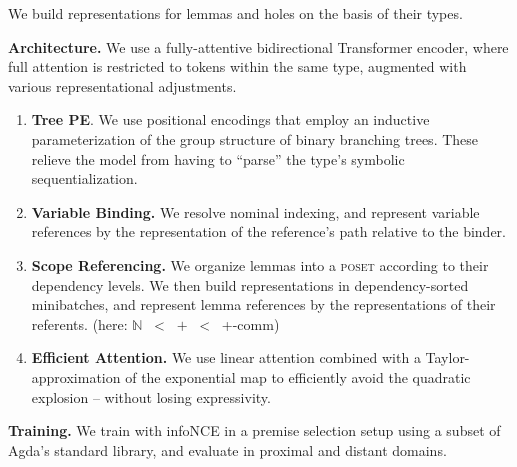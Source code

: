 \documentclass{article}
\newcommand{\sectionfont}{\fontsize{34}{34}\selectfont\setlength{\parskip}{1\baselineskip}}
\newcommand{\nfont}{\fontsize{21}{22}\selectfont\setlength{\parskip}{1\baselineskip}}
\newcommand{\light}[1]{\textcolor{gray!90}{#1}}
\begin{document}
	\begin{minipage}[t]{0.29\textwidth}
	\sectionfont{\textbf{Representation Learning}}
	\nfont

	We build representations for lemmas and holes on the basis of their types.
	
	\textbf{Architecture.} We use a fully-attentive bidirectional Transformer encoder, where full attention is restricted to tokens within the same type, augmented with various representational adjustments.
	\begin{enumerate}[topsep=-0.75\baselineskip]
		\item \textbf{Tree PE}. We use positional encodings that employ an inductive parameterization of the group structure of binary branching trees. These relieve the model from having to ``parse'' the type's symbolic sequentialization.
		\item \textbf{Variable Binding.} We resolve nominal indexing, and represent variable references by the representation of the reference's path relative to the binder.
		\item \textbf{Scope Referencing.} We organize lemmas into a \textsc{poset} according to their dependency levels. We then build representations in dependency-sorted minibatches, and represent lemma references by the representations of their referents.
		\light{\hfill (here: $\mathbb{N}$ ~<~ $+$ ~<~ +-comm)}
		\item \textbf{Efficient Attention.} We use linear attention combined with a Taylor-approximation of the exponential map to efficiently avoid the quadratic explosion -- without losing expressivity.
	\end{enumerate}
	
	\vspace{\baselineskip}
	\textbf{Training.} We train with infoNCE in a premise selection setup using a subset of Agda's standard library, and evaluate in proximal and distant domains.
	
	{\newcommand{\stdlib}{\texttt{stdlib}}
	\newcommand\unimath{\texttt{Unimath}}
	\newcommand\typetopo{\texttt{TypeTopo}}
	\newcommand\agdaQuill{\textsc{Quill}}	

	\newcommand{\sstat}[2]{\hphantom{1}\ensuremath{#1}}
	\newcommand{\bstat}[2]{\ensuremath{#1}}
	\newcommand{\bfstat}[2]{\ensuremath{\mathbf{#1}}}
	
	
}
\end{minipage}
\end{document}
